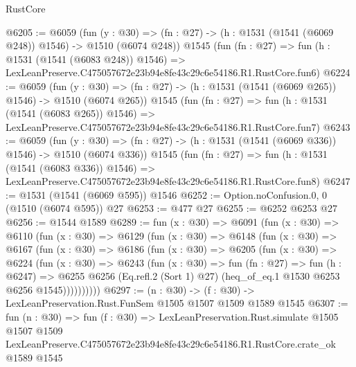 \begin{lexlean}{RustCore}
\begin{coremodule}
@6205 := @6059
    (fun (y : @30) => (fn : @27) -> (h : @1531 (@1541 (@6069 @248)) @1546) -> @1510 (@6074 @248))
    @1545
    (fun (fn : @27) =>
    fun (h : @1531 (@1541 (@6083 @248)) @1546) =>
    LexLeanPreserve.C475057672e23b94e8fe43c29c6e54186.R1.RustCore.fun6)
@6224 := @6059
    (fun (y : @30) => (fn : @27) -> (h : @1531 (@1541 (@6069 @265)) @1546) -> @1510 (@6074 @265))
    @1545
    (fun (fn : @27) =>
    fun (h : @1531 (@1541 (@6083 @265)) @1546) =>
    LexLeanPreserve.C475057672e23b94e8fe43c29c6e54186.R1.RustCore.fun7)
@6243 := @6059
    (fun (y : @30) => (fn : @27) -> (h : @1531 (@1541 (@6069 @336)) @1546) -> @1510 (@6074 @336))
    @1545
    (fun (fn : @27) =>
    fun (h : @1531 (@1541 (@6083 @336)) @1546) =>
    LexLeanPreserve.C475057672e23b94e8fe43c29c6e54186.R1.RustCore.fun8)
@6247 := @1531 (@1541 (@6069 @595)) @1546
@6252 := Option.noConfusion.{0, 0} (@1510 (@6074 @595)) @27
@6253 := @477 @27
@6255 := @6252 @6253 @27
@6256 := @1544 @1589
@6289 := fun (x : @30) =>
  @6091
    (fun (x : @30) =>
    @6110
      (fun (x : @30) =>
      @6129
        (fun (x : @30) =>
        @6148
          (fun (x : @30) =>
          @6167
            (fun (x : @30) =>
            @6186
              (fun (x : @30) =>
              @6205
                (fun (x : @30) =>
                @6224
                  (fun (x : @30) =>
                  @6243
                    (fun (x : @30) =>
                    fun (fn : @27) =>
                    fun (h : @6247) =>
                    @6255
                      @6256
                      (Eq.refl.{2} (Sort 1) @27)
                      (heq_of_eq.{1} @1530 @6253 @6256 @1545))))))))))
@6297 := (n : @30) -> (f : @30) -> LexLeanPreservation.Rust.FunSem @1505 @1507 @1509 @1589 @1545
@6307 := fun (n : @30) =>
  fun (f : @30) =>
  LexLeanPreservation.Rust.simulate
    @1505
    @1507
    @1509
    LexLeanPreserve.C475057672e23b94e8fe43c29c6e54186.R1.RustCore.crate_ok
    @1589
    @1545
\end{coremodule}
\end{lexlean}
